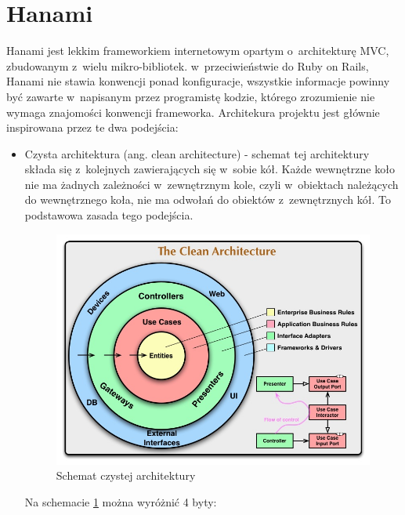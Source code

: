 \documentclass[printmode]{mgr}
\begin{document}
\section{Hanami}

Hanami jest lekkim frameworkiem internetowym opartym o~architekturę MVC, zbudowanym z~wielu mikro-bibliotek. w~przeciwieństwie do Ruby on Rails, Hanami nie stawia konwencji ponad konfiguracje, wszystkie informacje powinny być zawarte w~napisanym przez programistę kodzie, którego zrozumienie nie wymaga znajomości konwencji frameworka. Architekura projektu jest głównie inspirowana przez te dwa podejścia:

\begin{itemize}
  \item Czysta architektura (ang. clean architecture) - schemat tej architektury składa się z~kolejnych zawierających się w~sobie kół. Każde wewnętrzne koło nie ma żadnych zależności w~zewnętrznym kole, czyli w~obiektach należących do wewnętrznego koła, nie ma odwołań do obiektów z~zewnętrznych kół\cite{clean_architecture}. To podstawowa zasada tego podejścia. 

  \begin{figure}[H]
    \centering
    \includegraphics[width=1\linewidth]{obrazki/clean_architecture}
    \caption{Schemat czystej architektury}
    \label{fig:clean_architecture}
  \end{figure}

  Na schemacie \ref{fig:clean_architecture} można wyróżnić 4 byty:


\end{itemize}
\end{document}
